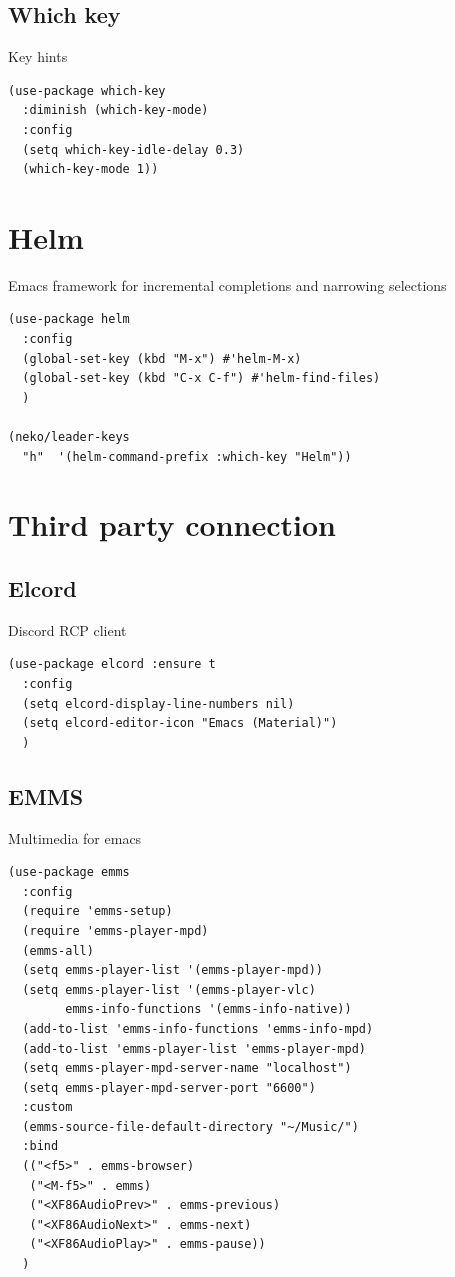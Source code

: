 \documentclass[11pt]{article}
\begin{document}
\subsection{Which key}
\label{sec:orgf644ee6}

Key hints

\begin{verbatim}
(use-package which-key
  :diminish (which-key-mode)
  :config
  (setq which-key-idle-delay 0.3)
  (which-key-mode 1))
\end{verbatim}

\section{Helm}
\label{sec:orgaf5e76c}

Emacs framework for incremental completions and narrowing selections

\begin{verbatim}
(use-package helm
  :config
  (global-set-key (kbd "M-x") #'helm-M-x)
  (global-set-key (kbd "C-x C-f") #'helm-find-files)
  )

(neko/leader-keys
  "h"  '(helm-command-prefix :which-key "Helm"))
\end{verbatim}

\section{Third party connection}
\label{sec:orgd720025}
\subsection{Elcord}
\label{sec:orgaf7c77e}

Discord RCP client

\begin{verbatim}
(use-package elcord :ensure t
  :config
  (setq elcord-display-line-numbers nil)
  (setq elcord-editor-icon "Emacs (Material)")
  )
\end{verbatim}

\subsection{EMMS}
\label{sec:org0b45a2c}

Multimedia for emacs

\begin{verbatim}
(use-package emms
  :config
  (require 'emms-setup)
  (require 'emms-player-mpd)
  (emms-all)
  (setq emms-player-list '(emms-player-mpd))
  (setq emms-player-list '(emms-player-vlc)
        emms-info-functions '(emms-info-native))
  (add-to-list 'emms-info-functions 'emms-info-mpd)
  (add-to-list 'emms-player-list 'emms-player-mpd)
  (setq emms-player-mpd-server-name "localhost")
  (setq emms-player-mpd-server-port "6600")
  :custom
  (emms-source-file-default-directory "~/Music/")
  :bind
  (("<f5>" . emms-browser)
   ("<M-f5>" . emms)
   ("<XF86AudioPrev>" . emms-previous)
   ("<XF86AudioNext>" . emms-next)
   ("<XF86AudioPlay>" . emms-pause))
  )
\end{verbatim}
\end{document}
